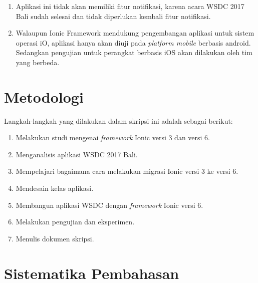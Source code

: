 \begin{enumerate}
    \item Aplikasi ini tidak akan memiliki fitur notifikasi, karena acara WSDC 2017 Bali sudah selesai dan tidak diperlukan kembali fitur notifikasi.
    \item Walaupun Ionic Framework mendukung pengembangan aplikasi untuk sistem operasi iO, aplikasi hanya akan diuji pada \textit{platform mobile} berbasis android. Sedangkan pengujian untuk perangkat berbasis iOS akan dilakukan oleh tim yang berbeda.
\end{enumerate}


\section{Metodologi}
\label{sec:metlit}

Langkah-langkah yang dilakukan dalam skripsi ini adalah sebagai berikut:

\begin{enumerate}
	\item Melakukan studi mengenai {\it framework} Ionic versi 3 dan versi 6.
	\item Menganalisis aplikasi WSDC 2017 Bali.
	\item Mempelajari bagaimana cara melakukan migrasi Ionic versi 3 ke versi 6.
	\item Mendesain kelas aplikasi.
	\item Membangun aplikasi WSDC dengan {\it framework} Ionic versi 6. 
	\item Melakukan pengujian dan eksperimen.
	\item Menulis dokumen skripsi.
\end{enumerate}


\section{Sistematika Pembahasan}
\label{sec:sispem}

